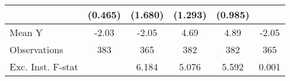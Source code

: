 {\begin{tabular}{l*{5}{c}}
            &     (0.465)         &     (1.680)         &     (1.293)         &     (0.985)         &                     \\
\midrule
Mean Y      &       -2.03         &       -2.05         &        4.69         &        4.89         &       -2.05         \\
Observations&         383         &         365         &         382         &         382         &         365         \\
Exc. Inst. F-stat&                     &       6.184         &       5.076         &       5.592         &       0.001         \\
\bottomrule
\end{tabular}
}
